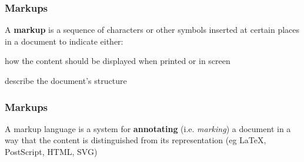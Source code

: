\documentclass[12pt]{beamer}\usepackage[]{graphicx}\usepackage[]{color}
\begin{document}

\begin{frame}
\frametitle{Markups}

A \textbf{markup} is a sequence of characters or other symbols inserted at certain places in a document to indicate either: 
\bi
 \item how the content should be displayed when printed or in screen
 \item describe the document's structure
\ei
\eb

\end{frame}


\begin{frame}
\frametitle{Markups}

A markup language is a system for \textbf{annotating} (i.e. \textit{marking}) a document in a way that the content is distinguished from its representation (eg LaTeX, PostScript, HTML, SVG)
\eb

\end{frame}

\end{document}
